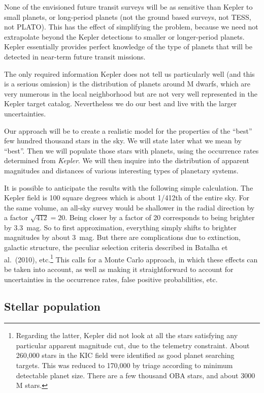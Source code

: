\documentclass{emulateapj}
\begin{document}
None of the envisioned future transit surveys will be as sensitive
than Kepler to small planets, or long-period planets (not the ground
based surveys, not TESS, not PLATO).  This has the effect of
simplifying the problem, because we need not extrapolate beyond the
Kepler detections to smaller or longer-period planets. Kepler
essentially provides perfect knowledge of the type of planets that
will be detected in near-term future transit missions.

The only required information Kepler does not tell us particularly
well (and this is a serious omission) is the distribution of planets
around M dwarfs, which are very numerous in the local neighborhood but
are not very well represented in the Kepler target
catalog. Nevertheless we do our best and live with the larger
uncertainties.

Our approach will be to create a realistic model for the properties of
the ``best'' few hundred thousand stars in the sky. We will state
later what we mean by ``best''. Then we will populate those stars with
planets, using the occurrence rates determined from {\it Kepler}.  We
will then inquire into the distribution of apparent magnitudes and
distances of various interesting types of planetary systems.

It is possible to anticipate the results with the following simple
calculation. The Kepler field is 100 square degrees which is about
1/412th of the entire sky. For the same volume, an all-sky survey
would be shallower in the radial direction by a factor $\sqrt{412} =
20$.  Being closer by a factor of 20 corresponds to being brighter by
3.3~mag.  So to first approximation, everything simply shifts to
brighter magnitudes by about 3~mag.  But there are complications due
to extinction, galactic structure, the peculiar selection criteria
described in Batalha et al.\ (2010), etc.\footnote{Regarding the
  latter, Kepler did not look at all the stars satisfying any
  particular apparent magnitude cut, due to the telemetry constraint.
  About 260,000 stars in the KIC field were identified as good planet
  searching targets. This was reduced to 170,000 by triage according
  to minimum detectable planet size. There are a few thousand OBA
  stars, and about 3000 M stars.} This calls for a Monte Carlo
approach, in which these effects can be taken into account, as well as
making it straightforward to account for uncertainties in the
occurrence rates, false positive probabilities, etc.

\subsection{Stellar population}
\end{document}
